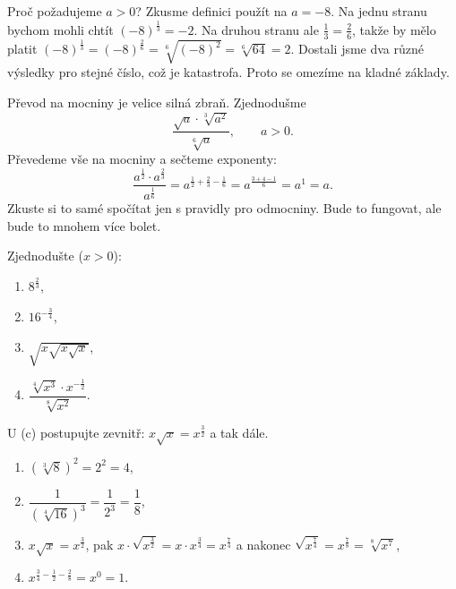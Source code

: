 \begin{note}
  Proč požadujeme $a > 0$? Zkusme definici použít na $a = -8$. Na jednu stranu bychom mohli chtít ${(-8)}^{\frac{1}{3}} = -2$. Na druhou stranu ale $\frac{1}{3} = \frac{2}{6}$, takže by mělo platit ${(-8)}^{\frac{1}{3}} = {(-8)}^{\frac{2}{6}} = \sqrt[6]{{(-8)}^2} = \sqrt[6]{64} = 2$. Dostali jsme dva různé výsledky pro stejné číslo, což je katastrofa. Proto se omezíme na kladné základy.
\end{note}

\begin{example}
  Převod na mocniny je velice silná zbraň. Zjednodušme
  \begin{equation*}
    \frac{\sqrt{a}\cdot\sqrt[3]{a^2}}{\sqrt[6]{a}}, \qquad a > 0.
  \end{equation*}
  Převedeme vše na mocniny a sečteme exponenty:
  \begin{equation*}
    \frac{a^{\frac{1}{2}}\cdot a^{\frac{2}{3}}}{a^{\frac{1}{6}}} = a^{\frac{1}{2} + \frac{2}{3} - \frac{1}{6}} = a^{\frac{3 + 4 - 1}{6}} = a^1 = a.
  \end{equation*}
  Zkuste si to samé spočítat jen s pravidly pro odmocniny. Bude to fungovat, ale bude to mnohem více bolet.
\end{example}

\begin{problem}
  Zjednodušte ($x > 0$):
  \begin{enumerate}[label=(\alph*)]
    \item $8^{\frac{2}{3}}$,
    \item $16^{-\frac{3}{4}}$,
    \item $\sqrt{x\sqrt{x\sqrt{x}}}$,
    \item $\dfrac{\sqrt[4]{x^3}\cdot x^{-\frac{1}{2}}}{\sqrt[8]{x^2}}$.
  \end{enumerate}
\end{problem}

\begin{hint}
  U (c) postupujte zevnitř: $x\sqrt{x} = x^{\frac{3}{2}}$ a tak dále.
\end{hint}

\begin{solution}
  \begin{enumerate}[label=(\alph*)]
    \item ${(\sqrt[3]{8})}^2 = 2^2 = 4$,
    \item $\dfrac{1}{{(\sqrt[4]{16})}^3} = \dfrac{1}{2^3} = \dfrac{1}{8}$,
    \item $x\sqrt{x} = x^{\frac{3}{2}}$, pak $x\cdot\sqrt{x^{\frac{3}{2}}} = x\cdot x^{\frac{3}{4}} = x^{\frac{7}{4}}$ a nakonec $\sqrt{x^{\frac{7}{4}}} = x^{\frac{7}{8}} = \sqrt[8]{x^7}$,
    \item $x^{\frac{3}{4} - \frac{1}{2} - \frac{2}{8}} = x^{0} = 1$.
  \end{enumerate}
\end{solution}

